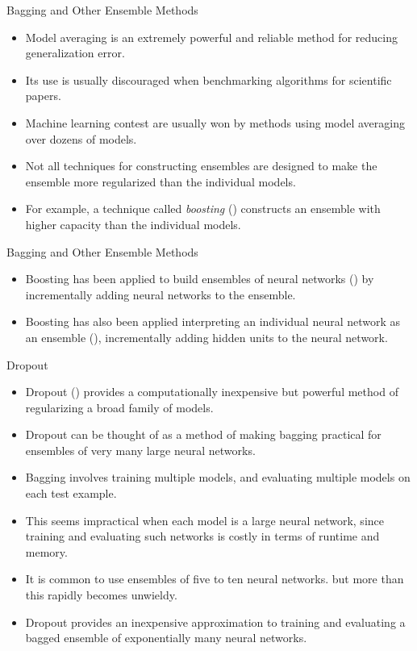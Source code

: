 \documentclass[10pt]{beamer}
\begin{document}
	\begin{frame}{Bagging and Other Ensemble Methods}
		\begin{itemize}
			\item Model averaging is an extremely powerful and reliable method for reducing generalization error.
			\pause
			\item Its use is usually discouraged when benchmarking algorithms for scientific papers.
			\pause
			\item Machine learning contest are usually won by methods using model averaging over dozens of models.
			\pause
			\item Not all techniques for constructing ensembles are designed to make the ensemble more regularized than the individual models.
			\pause
			\item For example, a technique called \emph{boosting} (\citet{freund1996experiments}) constructs an ensemble with higher capacity than the individual models. 
		\end{itemize}
	\end{frame}
	
	\begin{frame}{Bagging and Other Ensemble Methods}
		\begin{itemize}
			\item Boosting has been applied to build ensembles of neural networks (\citet{schwenk1998training}) by incrementally adding neural networks to the ensemble.
			\pause
			\item Boosting has also been applied interpreting an individual neural network as an ensemble (\citet{bengio2006convex}), incrementally adding hidden units to the neural network.
		\end{itemize}
	\end{frame}
	
	\begin{frame}{Dropout}
		\begin{itemize}
			\item Dropout (\citep{srivastava2014dropout}) provides a computationally inexpensive but powerful method of regularizing a broad family of models.
			\pause
			\item Dropout can be thought of as a method of making bagging practical for ensembles of very many large neural networks.
			\pause
			\item Bagging involves training multiple models, and evaluating multiple models on each test example. 
			\pause 
			\item This seems impractical when each model is a large neural network, since training and evaluating such networks is costly in terms of runtime and memory.
			\pause
			\item It is common to use ensembles of five to ten neural networks. but more than this rapidly becomes unwieldy.
			\pause
			\item Dropout provides an inexpensive approximation to training and evaluating a bagged ensemble of exponentially many neural networks.
		\end{itemize}
	\end{frame}
	
\end{document}
